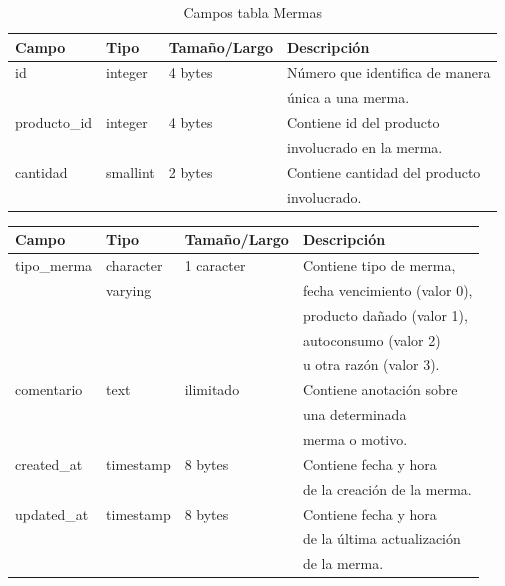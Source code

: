 \documentclass[letterpaper,12pt]{article}
\begin{document}
\begin{enumerate}
\begin{table}[!ht]
\caption{Campos tabla Mermas}
\begin{center}
\begin{tabular}{|l|l|l|l|}
\hline
\textbf{Campo} \hspace*{2cm} & \textbf{Tipo} & \textbf{Tamaño/Largo} & \textbf{Descripción} \hspace*{3,5cm} \\
\hline
id& integer & 4 bytes&Número que identifica de manera \\ 
\mbox{} & \mbox{} & &única a una merma.\\
\hline

producto\_id & integer & 4 bytes&Contiene id del producto\\
\mbox{} & \mbox{} & &involucrado en la merma.\\
\hline

cantidad & smallint &2 bytes &Contiene cantidad del producto \\
\mbox{} & \mbox{} & &involucrado.\\
\hline

\end{tabular}
\end{center}
\end{table}

\newpage

\begin{table}[!ht]
\begin{center}
\begin{tabular}{|l|l|l|l|}
\hline
\textbf{Campo} \hspace*{2cm} & \textbf{Tipo} & \textbf{Tamaño/Largo} & \textbf{Descripción} \hspace*{3cm} \\
\hline


tipo\_merma & character &1 caracter &Contiene tipo de merma, \\
\mbox{} & varying & &fecha vencimiento (valor 0),\\
\mbox{} & \mbox{} & &producto dañado (valor 1),\\
\mbox{} & \mbox{} & &autoconsumo (valor 2) \\
\mbox{} & \mbox{} & &u otra razón (valor 3).\\
\hline

comentario & text & ilimitado &Contiene anotación sobre\\
\mbox{} & \mbox{} & &una determinada\\
\mbox{} & \mbox{} & &merma o motivo.\\
\hline
created\_at& timestamp & 8 bytes &Contiene fecha y hora\\
\mbox{} & \mbox{} & &de la creación de la merma.\\
\hline
updated\_at& timestamp & 8 bytes &Contiene fecha y hora\\
\mbox{} & \mbox{} & &de la última actualización\\
\mbox{} & \mbox{} & &de la merma.\\
\hline


\end{tabular}
\end{center}
\end{table}
\end{enumerate}
\end{document}
